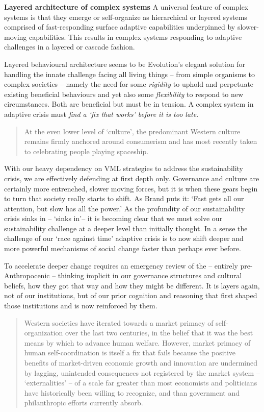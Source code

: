 \documentclass[
]{book}
\begin{document}
\textbf{Layered architecture of complex systems}
A universal feature of complex systems is that they emerge or self-organize as hierarchical or layered
systems comprised of fast-responding surface adaptive capabilities underpinned by slower-moving
capabilities. This results in complex systems responding to adaptive challenges in a layered or
cascade fashion.

Layered behavioural architecture seems to be
Evolution's elegant solution for handling the innate challenge facing all living things -- from simple
organisms to complex societies -- namely the need for some \emph{rigidity} to uphold and perpetuate existing
beneficial behaviours and yet also some \emph{flexibility} to respond to new circumstances. Both are
beneficial but must be in tension.
A complex system in adaptive crisis
must \emph{find a `fix that works' before it is too late}.

\begin{quote}
At the even lower level of `culture', the predominant Western culture remains firmly
anchored around consumerism and has most recently taken to celebrating people playing spaceship.
\end{quote}

With our heavy dependency on VML strategies to address
the sustainability crisis, we are effectively defending at first depth only. Governance and culture
are certainly more entrenched, slower moving forces, but it is when these gears begin to turn that
society really starts to shift. As Brand puts it:
`Fast gets all our attention, but slow has all the power.'
As the profundity of our sustainability crisis sinks in -- `sinks in'-- it is becoming clear that we must
solve our sustainability challenge at a deeper level than initially thought. In a sense the challenge of
our `race against time' adaptive crisis is to now shift deeper and more powerful mechanisms of social
change faster than perhaps ever before.

To accelerate deeper
change requires an emergency review of the -- entirely pre-Anthropocenic -- thinking implicit in our
governance structures and cultural beliefs, how they got that way and how they might be different. It
is layers again, not of our institutions, but of our prior cognition and reasoning that first shaped
those institutions and is now reinforced by them.

\begin{quote}
Western
societies have iterated towards a market primacy of self-organization over the last two centuries, in
the belief that it was the best means by which to advance human welfare. However, market primacy
of human self-coordination is itself a fix that fails because the positive benefits of market-driven
economic growth and innovation are undermined by lagging, unintended consequences not
registered by the market system -- `externalities' -- of a scale far greater than most economists and
politicians have historically been willing to recognize, and than government and philanthropic
efforts currently absorb.
\end{quote}
\end{document}
